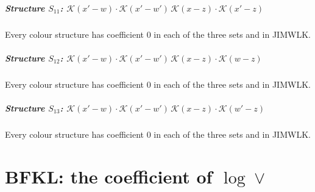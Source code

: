 \documentclass[10pt]{article}
\numberwithin{equation}{section}
\begin{document}
\subsubsection*{Structure $S_{11}$: $\mathcal{K}(x'-w)\cdot\mathcal{K}(x'-w')\,\mathcal{K}(x-z)\cdot\mathcal{K}(x'-z)$}
Every colour structure has coefficient 0 in each of the three sets and in JIMWLK.
\subsubsection*{Structure $S_{12}$: $\mathcal{K}(x'-w)\cdot\mathcal{K}(x'-w')\,\mathcal{K}(x-z)\cdot\mathcal{K}(w-z)$}
Every colour structure has coefficient 0 in each of the three sets and in JIMWLK.
\subsubsection*{Structure $S_{13}$: $\mathcal{K}(x'-w)\cdot\mathcal{K}(x'-w')\,\mathcal{K}(x-z)\cdot\mathcal{K}(w'-z)$}
Every colour structure has coefficient 0 in each of the three sets and in JIMWLK.

\part{BFKL: the coefficient of \texorpdfstring{$\log\vee$}{log vee}}
\end{document}
